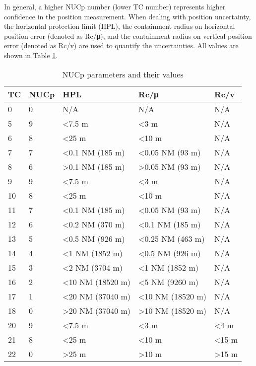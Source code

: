 In general, a higher NUCp number (lower TC number) represents higher confidence in the position measurement. When dealing with position uncertainty, the horizontal protection limit (HPL), the containment radius on horizontal position error (denoted as Rc/μ), and the containment radius on vertical position error (denoted as Rc/v) are used to quantify the uncertainties. All values are shown in Table \ref{tb:nucp-params}.

\begin{table}[!ht]
\caption{NUCp parameters and their values}
\label{tb:nucp-params}
\begin{tabular}{|l|l|l|l|l|}
\hline
\textbf{TC} & \textbf{NUCp} & \textbf{HPL} & \textbf{Rc/μ} & \textbf{Rc/v} \\ \hline \hline
0 & 0 & N/A & N/A & N/A \\ \hline
5 & 9 & \textless 7.5 m & \textless 3 m & N/A \\ \hline
6 & 8 & \textless 25 m & \textless 10 m & N/A \\ \hline
7 & 7 & \textless 0.1 NM (185 m) & \textless 0.05 NM (93 m) & N/A \\ \hline
8 & 6 & \textgreater 0.1 NM (185 m) & \textgreater 0.05 NM (93 m) & N/A \\ \hline
\hline
9 & 9 & \textless 7.5 m & \textless 3 m & N/A \\ \hline
10 & 8 & \textless 25 m & \textless 10 m & N/A \\ \hline
11 & 7 & \textless 0.1 NM (185 m) & \textless 0.05 NM (93 m) & N/A \\ \hline
12 & 6 & \textless 0.2 NM (370 m) & \textless 0.1 NM (185 m) & N/A \\ \hline
13 & 5 & \textless 0.5 NM (926 m) & \textless 0.25 NM (463 m) & N/A \\ \hline
14 & 4 & \textless 1 NM (1852 m) & \textless 0.5 NM (926 m) & N/A \\ \hline
15 & 3 & \textless 2 NM (3704 m) & \textless 1 NM (1852 m) & N/A \\ \hline
16 & 2 & \textless 10 NM (18520 m) & \textless 5 NM (9260 m) & N/A \\ \hline
17 & 1 & \textless 20 NM (37040 m) & \textless 10 NM (18520 m) & N/A \\ \hline
18 & 0 & \textgreater 20 NM (37040 m) & \textgreater 10 NM (18520 m) & N/A \\ \hline
\hline
20 & 9 & \textless 7.5 m & \textless 3 m & \textless 4 m \\ \hline
21 & 8 & \textless 25 m & \textless 10 m & \textless 15 m \\ \hline
22 & 0 & \textgreater 25 m & \textgreater 10 m & \textgreater 15 m \\ \hline
\end{tabular}
\end{table}

